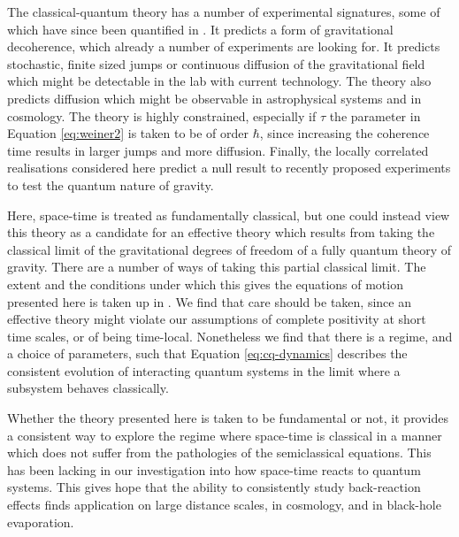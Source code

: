 \documentclass[aps,pra,showpacs,citeautoscript,amsmath,amssymb,floatfix,superscriptaddress,bbm, verbatim,amsfonts,changes,12pt,nofootinbib,longbibliography]{revtex4-2}
\newcommand{\foothide}[1]{\ignorespaces} %
\begin{document}
The classical-quantum theory has a number of experimental signatures, some of which have since been quantified in  \cite{oppenheim2021gravitationally}. It predicts a form of gravitational decoherence, which already a number of experiments are looking for\cite{bassi2013models,schmole2016micromechanical,carney2018massive}. %
It predicts stochastic, finite sized jumps\foothide{Here, space-time, as well as $g_{ab},\pi^{ab}$ are taken to be continuous, while the jumps in phase space are not. It's possible to imagine a theory in which the metric is discrete or even space-time itself, however, 
	there is no need to go this far in the present context.} or continuous diffusion of the gravitational field which might be detectable in the lab with current technology. 
The theory also predicts diffusion which might be observable in astrophysical systems and in cosmology. The theory is highly constrained, especially if $\tau$ the parameter in Equation \eqref{eq:weiner2} is taken to be of order $\hbar$, since increasing the coherence time results in larger jumps and more diffusion. 
Finally, the locally correlated realisations considered here predict a null result to recently proposed experiments to test the quantum nature of gravity\cite{kafri2013noise,bose2017spin,marletto2017gravitationally,entanglement_foot}. 

Here, space-time is treated as fundamentally classical, but one could instead  view this theory as  a candidate for an effective theory which results from taking the classical limit of the gravitational degrees of freedom of a fully quantum theory of gravity. 	There are a number of ways of taking this partial classical limit. The extent and the conditions under which this gives the equations of motion presented here is taken up in \cite{UCLQQtoCQ}. We find that care should be taken, since an effective theory might violate our assumptions of complete positivity at short time scales, or of being time-local. Nonetheless we find that there is a regime, and a choice of parameters, such that Equation \eqref{eq:cq-dynamics} describes the consistent evolution of interacting quantum systems in the limit where a subsystem behaves classically.

 Whether the theory presented here is taken to be fundamental or not, it provides a consistent way to explore the regime where space-time is classical in a manner which does not suffer from the pathologies of the semiclassical equations.  This has been lacking in our investigation into how space-time reacts to quantum systems.  This gives hope that the ability to consistently study back-reaction effects finds application on large distance scales, in cosmology, and in black-hole evaporation. 
 
\end{document}
